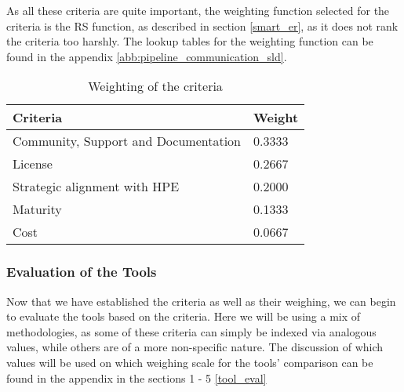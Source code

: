 As all these criteria are quite important, the weighting function selected for the criteria is the \ac{RS} function, as described in section \ref{smart_er}, 
as it does not rank the criteria too harshly.
The lookup tables for the weighting function can be found in the appendix \ref{abb:pipeline_communication_sld}.

\begin{table}[htb]
    \centering
    \begin{tabular}{|l|l|} \hline
        \textbf{Criteria}                       & \textbf{Weight}       \\ \hline
        Community, Support and  Documentation   &  0.3333               \\ \hline
        License                                 &  0.2667               \\ \hline
        Strategic alignment with \ac{HPE}       &  0.2000               \\ \hline
        Maturity                                &  0.1333               \\ \hline
        Cost                                    &  0.0667               \\ \hline
    \end{tabular}
    \caption{Weighting of the criteria}
    \label{tab:weighting_of_the_criteria}
\end{table}

\subsubsection{Evaluation of the Tools}

Now that we have established the criteria as well as their weighing, we can begin to evaluate the tools based on the criteria.
Here we will be using a mix of methodologies, as some of these criteria can simply be indexed via analogous values, while others are of a more non-specific nature.
The discussion of which values will be used on which weighing scale for the tools' comparison can be found in the appendix in the sections 1 - 5 \ref{tool_eval}


